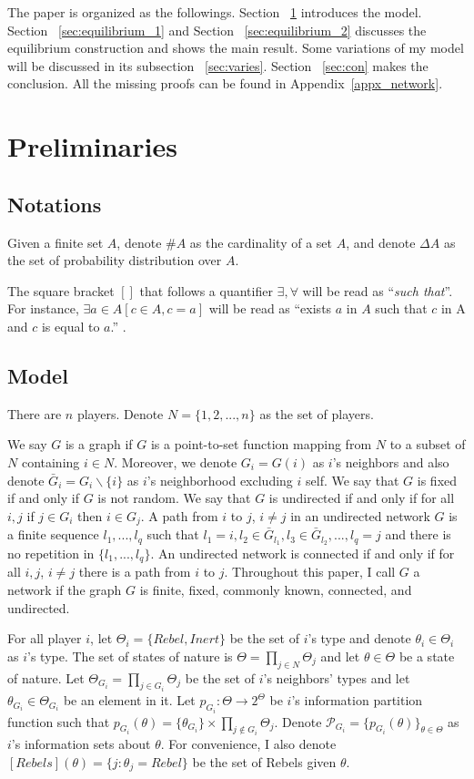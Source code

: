 \documentclass[12pt,letter]{article}
\theoremstyle{definition}
\theoremstyle{remark}
\theoremstyle{claim}
\begin{document}
The paper is organized as the followings. Section ~\ref{sec:model} introduces the model. Section ~\ref{sec:equilibrium_1} and Section ~\ref{sec:equilibrium_2} discusses the equilibrium construction and shows the main result. Some variations of my model will be discussed in its subsection ~\ref{sec:varies}. Section ~\ref{sec:con} makes the conclusion. All the missing proofs can be found in Appendix~\ref{appx_network}.

\section{Preliminaries}
\label{sec:model}
\subsection{Notations}
Given a finite set $A$, denote $\#A$ as the cardinality of a set $A$, and denote $\Delta A$ as the set of probability distribution over $A$. 

The square bracket $[]$ that follows a quantifier $\exists, \forall$ will be read as ``\textit{such that}''. For instance, $\exists a \in A [c\in A, c=a]$ will be read as ``exists $a$ in $A$ such that $c$ in A and $c$ is equal to $a$.'' .
\subsection{Model}


There are $n$ players. Denote $N=\{1,2,...,n\}$ as the set of players.  

We say $G$ is a graph if $G$ is a point-to-set function mapping from $N$ to a subset of $N$ containing $i\in N$. Moreover, we denote $G_i=G(i)$ as $i$'s neighbors and also denote $\bar{G}_i=G_i\backslash \{i\}$ as $i$'s neighborhood excluding $i$ self. We say that $G$ is fixed if and only if $G$ is not random. We say that $G$ is undirected if and only if for all $i,j$ if $j\in G_i$ then $i\in G_j$. A path from $i$ to $j$, $i\neq j$ in an undirected network $G$ is a finite sequence $l_1,...,l_q$ such that $l_1=i, l_2\in \bar{G}_{l_1}, l_3\in \bar{G}_{l_2},...,l_q=j$ and there is no repetition in $\{l_1,...,l_q\}$. An undirected network is connected if and only if for all $i,j$, $i\neq j$ there is a path from $i$ to $j$. Throughout this paper, I call $G$ a network if the graph $G$ is finite, fixed, commonly known, connected, and undirected. 

For all player $i$, let $\Theta_i=\{Rebel,Inert\}$ be the set of $i$'s type and denote $\theta_i\in \Theta_i$ as $i$'s type. The set of states of nature is $\Theta=\prod_{j\in N}\Theta_j$ and let $\theta\in \Theta$ be a state of nature. Let $\Theta_{G_i}=\prod_{j\in G_i}\Theta_j$ be the set of $i$'s neighbors' types and let $\theta_{G_i}\in \Theta_{G_i}$ be an element in it. Let $p_{G_i}:\Theta \rightarrow 2^{\Theta}$ be $i$'s information partition function such that $p_{G_i}(\theta)=\{\theta_{G_i}\}\times \prod_{j\not\in G_i}\Theta_j$.  Denote $\mathcal{P}_{G_i}=\{p_{G_i}(\theta)\}_{\theta\in \Theta}$ as $i$'s information sets about $\theta$. For convenience, I also denote $[Rebels](\theta)=\{j:\theta_j=Rebel\}$ be the set of Rebels given $\theta$.
\end{document}
